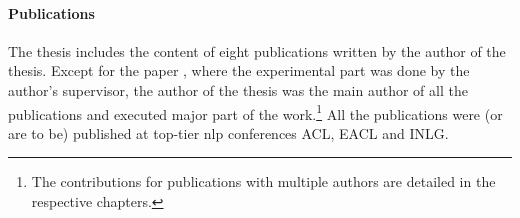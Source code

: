 \paragraph{Publications} The thesis includes the content of eight publications written by the author of the thesis. Except for the paper \citet{dusekEvaluatingSemanticAccuracy2020}, where the experimental part was done by the author's supervisor, the author of the thesis was the main author of all the publications and executed major part of the work.\footnote{The contributions for publications with multiple authors are detailed in the respective chapters.} All the publications were (or are to be) published at top-tier \ac{nlp} conferences ACL, EACL and INLG.

